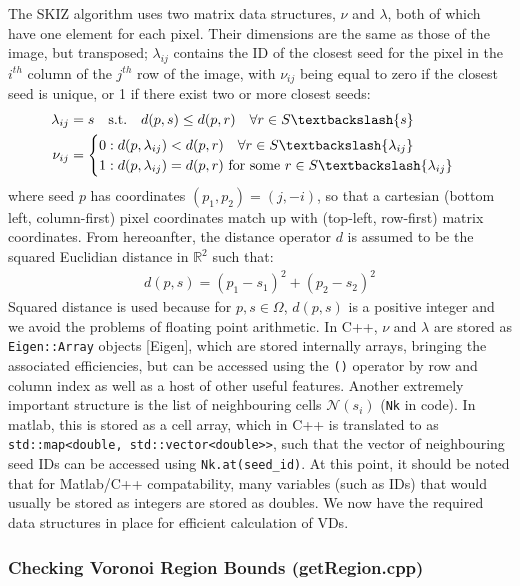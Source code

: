 \documentclass[12pt, report, a4paper, titlepage]{article}
\numberwithin{equation}{section}
\newcommand*{\citen}{}%
\DeclareRobustCommand*{\citen}[1]{%
  \begingroup
    \romannumeral-`\x %
    \setcitestyle{numbers}%
    \cite{#1}%
  \endgroup
}
\begin{document}
The SKIZ algorithm uses two matrix data structures, $\nu$ and $\lambda$, both of which have one element for each pixel. Their dimensions are the same as those of the image, but transposed; $\lambda_{ij}$ contains the ID of the closest seed for the pixel in the $i^{th}$ column of the $j^{th}$ row of the image, with $\nu_{ij}$ being equal to zero if the closest seed is unique, or 1 if there exist two or more closest seeds:
\begin{align}
\lambda_{ij} &= s \quad \text{s.t.}\quad d(p, s) \leq d(p, r) \quad \forall r \in S\textbackslash \{s\}\\
	\nu_{ij} &= \begin{cases}
	0 : d(p, \lambda_{ij}) < d(p, r) \quad \forall r \in S\textbackslash \{\lambda_{ij}\}\\
	1 : d(p, \lambda_{ij}) = d(p, r) \text{ for some } r \in S\textbackslash \{\lambda_{ij}\}
	\end{cases}
\end{align}
where seed $p$ has coordinates $(p_1, p_2) = (j, -i)$, so that a cartesian (bottom left, column-first) pixel coordinates match up with (top-left, row-first) matrix coordinates. From hereoanfter, the distance operator $d$ is assumed to be the squared Euclidian distance in $\mathbb{R}^2$ such that:
\begin{align}
	d(p, s) = (p_1 - s_1)^2 + (p_2 - s_2)^2
\end{align}
Squared distance is used because for $p, s \in \Omega$, $d(p, s)$ is a positive integer and we avoid the problems of floating point arithmetic. In C++, $\nu$ and $\lambda$ are stored as \verb|Eigen::Array| objects [\citen{Eigen}], which are stored internally arrays, bringing the associated efficiencies, but can be accessed using the \verb|()| operator by row and column index as well as a host of other useful features.
Another extremely important structure is the list of neighbouring cells $\mathcal{N}(s_i)$ (\verb|Nk| in code). In matlab, this is stored as a cell array, which in C++ is translated to as \verb|std::map<double, std::vector<double>>|, such that the vector of neighbouring seed IDs can be accessed using \verb|Nk.at(seed_id)|. At this point, it should be noted that for Matlab/C++ compatability, many variables (such as IDs) that would usually be stored as integers are stored as doubles. We now have the required data structures in place for efficient calculation of VDs.

\subsubsection{Checking Voronoi Region Bounds (getRegion.cpp)}
\end{document}
